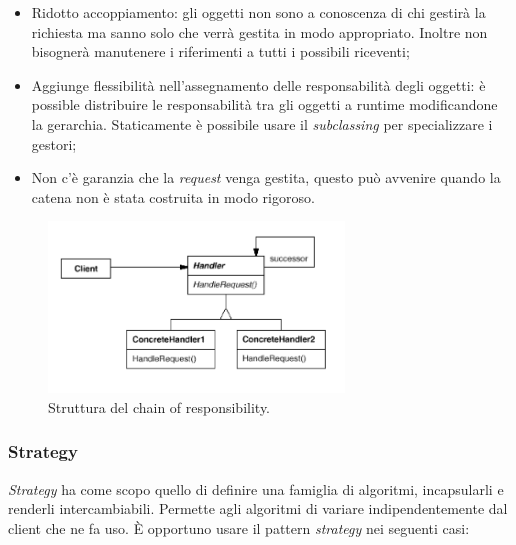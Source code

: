 \begin{itemize}

	\item Ridotto accoppiamento: gli oggetti non sono a conoscenza di chi gestirà la richiesta ma sanno solo che verrà gestita in modo appropriato. Inoltre non bisognerà manutenere i riferimenti a tutti i possibili riceventi;
	\item Aggiunge flessibilità nell'assegnamento delle responsabilità degli oggetti: è possible distribuire le responsabilità tra gli oggetti a runtime modificandone la gerarchia. Staticamente è possibile usare il \emph{subclassing} per specializzare i gestori;
 	\item Non c'è garanzia che la \emph{request} venga gestita, questo può avvenire quando la catena non è stata costruita in modo rigoroso.
 	
\end{itemize}
	 	
\begin{figure}[H]
\centering \includegraphics[width=0.7\textwidth]{patterns/ChainOfResponsability.png}
\caption{Struttura del chain of responsibility.}
\label{fig:chainofresponsibility}
\end{figure}
	
\subsubsection{Strategy}

\textit{Strategy} ha come scopo quello di definire una famiglia di algoritmi, incapsularli e renderli intercambiabili. Permette agli algoritmi di variare indipendentemente dal client che ne fa uso. È opportuno usare il pattern \textit{strategy} nei seguenti casi:

